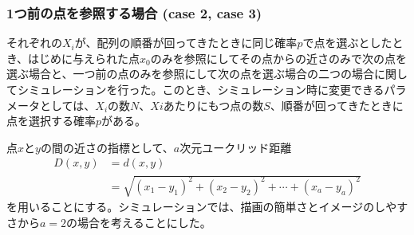 \subsubsection{1つ前の点を参照する場合 (case 2, case 3)}

それぞれの$X_{i}$が、配列の順番が回ってきたときに同じ確率$p$で点を選ぶとしたとき、はじめに与えられた点$x_{0}$のみを参照にしてその点からの近さのみで次の点を選ぶ場合と、一つ前の点のみを参照にして次の点を選ぶ場合の二つの場合に関してシミュレーションを行った。このとき、シミュレーション時に変更できるパラメータとしては、$X_{i}$の数$N$、$X{i}$あたりにもつ点の数$S$、順番が回ってきたときに点を選択する確率$p$がある。

点$x$と$y$の間の近さの指標として、$a$次元ユークリッド距離
\begin{align}D(x, y) &= d(x,y) \nonumber\\
&= \sqrt{(x_{1} - y_{1})^{2} + (x_{2} - y_{2})^{2} + \cdots + (x_{a} - y_{a})^{2}}\end{align}
を用いることにする。シミュレーションでは、描画の簡単さとイメージのしやすさから$a=2$の場合を考えることにした。

